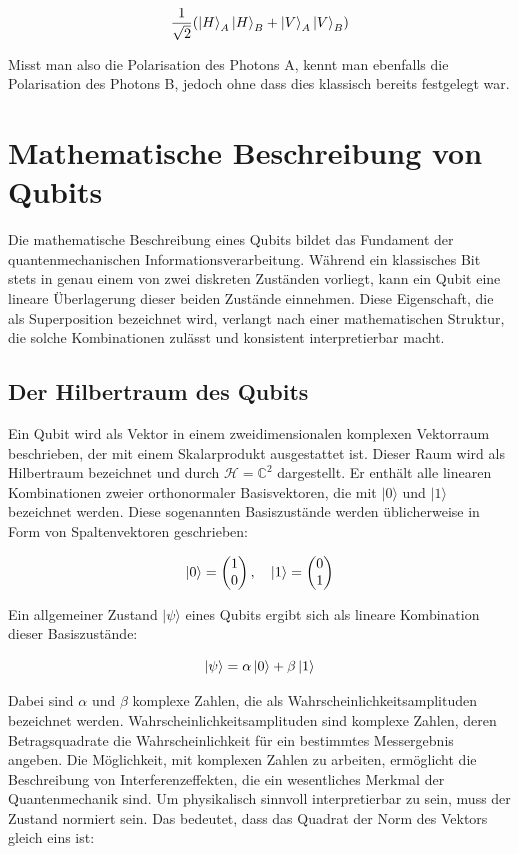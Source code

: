 \[
\frac{1}{\sqrt{2}}  ( \ket{H}_A \ket{H}_B + \ket{V}_A \ket{V}_B )
\]

Misst man also die Polarisation des Photons A, kennt man ebenfalls die Polarisation des Photons B, jedoch ohne dass dies klassisch bereits festgelegt war.
\cite{hughes_quantum_2021}

\section{Mathematische Beschreibung von Qubits}

Die mathematische Beschreibung eines Qubits bildet das Fundament der quantenmechanischen Informationsverarbeitung. Während ein klassisches Bit stets in genau einem von zwei diskreten Zuständen vorliegt, kann ein Qubit eine lineare Überlagerung dieser beiden Zustände einnehmen. Diese Eigenschaft, die als Superposition bezeichnet wird, verlangt nach einer mathematischen Struktur, die solche Kombinationen zulässt und konsistent interpretierbar macht.

\subsection{Der Hilbertraum des Qubits}

Ein Qubit wird als Vektor in einem zweidimensionalen komplexen Vektorraum beschrieben, der mit einem Skalarprodukt ausgestattet ist. Dieser Raum wird als Hilbertraum bezeichnet und durch \( \mathcal{H} = \mathbb{C}^2 \) dargestellt. Er enthält alle linearen Kombinationen zweier orthonormaler Basisvektoren, die mit \( |0\rangle \) und \( |1\rangle \) bezeichnet werden. Diese sogenannten Basiszustände werden üblicherweise in Form von Spaltenvektoren geschrieben:

\[
\ket{0} = \begin{pmatrix} 1 \\ 0 \end{pmatrix}, \quad \ket{1} = \begin{pmatrix} 0 \\ 1 \end{pmatrix}
\]

Ein allgemeiner Zustand \( |\psi\rangle \) eines Qubits ergibt sich als lineare Kombination dieser Basiszustände:

\[
\ket{\psi} = \alpha \ket{0} + \beta \ket{1} 
\]

Dabei sind \( \alpha \) und \( \beta \) komplexe Zahlen, die als Wahrscheinlichkeitsamplituden bezeichnet werden. Wahrscheinlichkeitsamplituden sind komplexe Zahlen, deren Betragsquadrate die Wahrscheinlichkeit für ein bestimmtes Messergebnis angeben. Die Möglichkeit, mit komplexen Zahlen zu arbeiten, ermöglicht die Beschreibung von Interferenzeffekten, die ein wesentliches Merkmal der Quantenmechanik sind. Um physikalisch sinnvoll interpretierbar zu sein, muss der Zustand normiert sein. Das bedeutet, dass das Quadrat der Norm des Vektors gleich eins ist:

